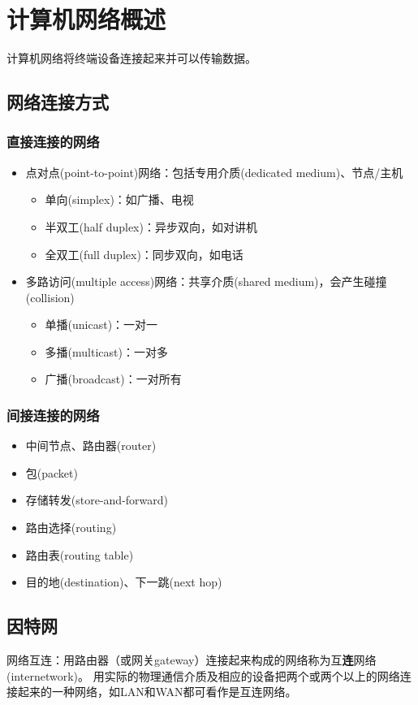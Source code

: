
\section{计算机网络概述}
计算机网络将终端设备连接起来并可以传输数据。

\subsection{网络连接方式}
\subsubsection{直接连接的网络}
\begin{itemize}
\item 点对点(point-to-point)网络：包括专用介质(dedicated medium)、节点/主机
\begin{itemize}
	\item 单向(simplex)：如广播、电视
	\item 半双工(half duplex)：异步双向，如对讲机
	\item 全双工(full duplex)：同步双向，如电话
\end{itemize}
\item 多路访问(multiple access)网络：共享介质(shared medium)，会产生碰撞(collision)
\begin{itemize}
	\item 单播(unicast)：一对一
	\item 多播(multicast)：一对多
	\item 广播(broadcast)：一对所有
\end{itemize}
\end{itemize}

\subsubsection{间接连接的网络}
\begin{itemize}
	\item 中间节点、路由器(router)
	\item 包(packet)
	\item 存储转发(store-and-forward)
	\item 路由选择(routing)
	\item 路由表(routing table)
	\item 目的地(destination)、下一跳(next hop)
\end{itemize}

\subsection{因特网}
网络互连：用路由器（或网关gateway）连接起来构成的网络称为互\textbf{连}网络(internetwork)。
用实际的物理通信介质及相应的设备把两个或两个以上的网络连接起来的一种网络，如LAN和WAN都可看作是互连网络。

